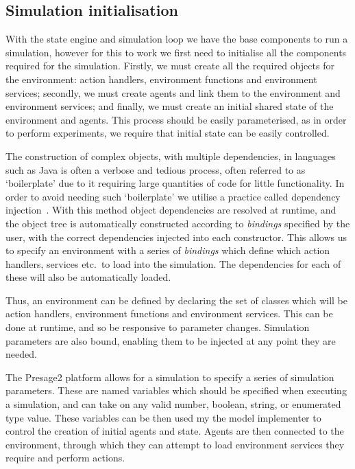 \subsection{Simulation initialisation}

With the state engine and simulation loop we have the base components to run a
simulation, however for this to work we first need to initialise all the
components required for the simulation. Firstly, we must create all the required
objects for the environment: action handlers, environment functions and
environment services; secondly, we must create agents and link them to the
environment and environment services; and finally, we must create an initial
shared state of the environment and agents. This process should be easily
parameterised, as in order to perform experiments, we require that initial state
can be easily controlled.

The construction of complex objects, with multiple dependencies, in languages
such as Java is often a verbose and tedious process, often referred to as 
`boilerplate' due to it requiring large quantities of code for little
functionality. In order to avoid needing such `boilerplate' we utilise a
practice called dependency injection~\citep{vanbrabant2008}. With this method
object dependencies are resolved at runtime, and the object tree is
automatically constructed according to \emph{bindings} specified by the user, with the
correct dependencies injected into each constructor. This allows us to specify
an environment with a series of \emph{bindings} which define which action
handlers, services etc.\ to load into the simulation. The dependencies for each of
these will also be automatically loaded.


Thus, an environment can be defined by declaring the set of classes which will
be action handlers, environment functions and environment services. This can be
done at runtime, and so be responsive to parameter changes. Simulation
parameters are also bound, enabling them to be injected at any point they are
needed.

The Presage2 platform allows for a simulation to specify a series of simulation
parameters. These are named variables which should be specified when executing a
simulation, and can take on any valid number, boolean, string, or enumerated
type value. These variables can be then used my the model implementer to control
the creation of initial agents and state. Agents are then connected to the
environment, through which they can attempt to load environment services they
require and perform actions.

